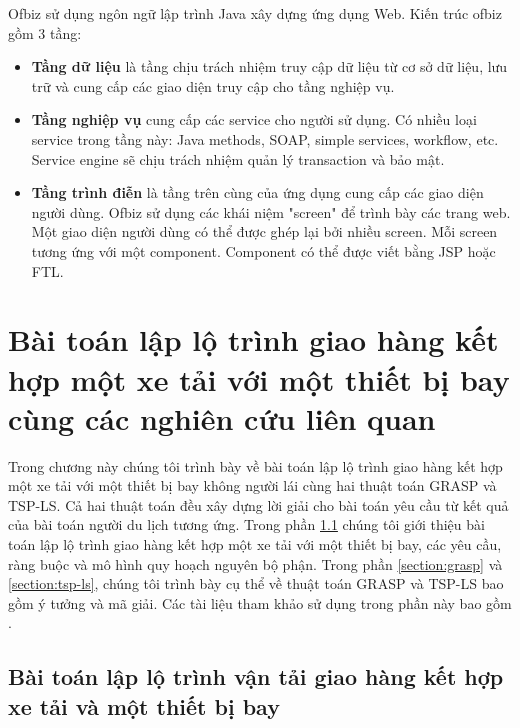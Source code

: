 \documentclass[a4paper,12pt]{report}
\begin{document}
Ofbiz sử dụng ngôn ngữ lập trình Java xây dựng ứng dụng Web. Kiến trúc ofbiz gồm 3 tầng: 
\begin{itemize}
\item \textbf{Tầng dữ liệu}  là tầng chịu trách nhiệm truy cập dữ liệu từ cơ sở dữ liệu, lưu trữ và cung cấp các giao diện truy cập cho tầng nghiệp vụ.

\item \textbf{Tầng nghiệp vụ} cung cấp các service cho người sử dụng. Có nhiều loại service trong tầng này: Java methods, \ac{SOAP}, simple services, workflow, etc. Service engine sẽ chịu trách nhiệm quản lý transaction và bảo mật.
\item \textbf{Tầng trình điễn} là tầng trên cùng của ứng dụng cung cấp các giao diện người dùng. Ofbiz sử dụng các khái niệm "screen" để trình bày các trang web. Một giao diện người dùng có thể được ghép lại bởi nhiều screen. Mỗi screen tương ứng với một component. Component có thể được viết bằng \ac{JSP} hoặc \ac{FTL}\cite{AOW}. 
\end{itemize}

\chapter{Bài toán lập lộ trình giao hàng  kết hợp một xe tải với  một thiết bị bay cùng các nghiên cứu liên quan }
Trong chương này chúng tôi trình bày về bài toán lập lộ trình giao hàng kết hợp một xe tải với một thiết bị bay không người lái cùng hai thuật toán \ac{GRASP} và TSP-LS. Cả hai thuật toán đều xây dựng lời giải cho bài toán yêu cầu từ kết quả của bài toán người du lịch tương ứng. Trong phần  \ref{section:tspd} chúng tôi giới thiệu bài toán lập lộ trình giao hàng kết hợp một xe tải với một thiết bị bay, các yêu cầu, ràng buộc và mô hình quy hoạch nguyên bộ phận. Trong phần \ref{section:grasp} và \ref{section:tsp-ls}, chúng tôi trình bày cụ thể về thuật toán \ac{GRASP} và TSP-LS bao gồm ý tưởng và mã giải. Các tài liệu tham khảo sử dụng trong phần này bao gồm \cite{main}\cite{bahiwww}.
\section{Bài toán lập lộ trình vận tải giao hàng kết hợp xe tải và một thiết bị bay}
\label{section:tspd}
\end{document}
